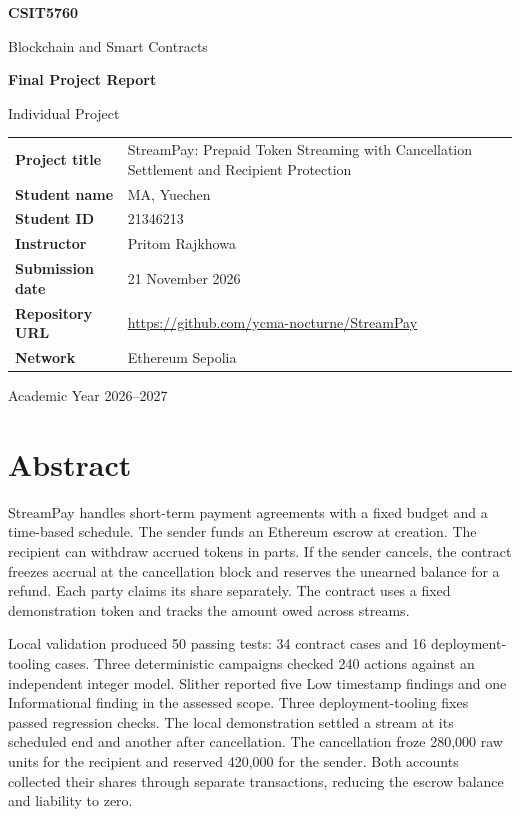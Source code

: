 \documentclass[12pt,a4paper]{report}
\begin{document}
\raggedbottom
\hypersetup{pageanchor=false}
\begin{titlepage}
\centering
\vspace*{1.4cm}
{\LARGE\bfseries CSIT5760\par}
\vspace{0.3cm}
{\Large Blockchain and Smart Contracts\par}
\vspace{1.2cm}
{\Huge\bfseries Final Project Report\par}
\vspace{0.3cm}
{\Large Individual Project\par}
\vfill
\begin{tabularx}{\linewidth}{@{}P{3.4cm}Y@{}}
\toprule
\textbf{Project title} & StreamPay: Prepaid Token Streaming with Cancellation Settlement and Recipient Protection\\
\textbf{Student name} & MA, Yuechen\\
\textbf{Student ID} & 21346213\\
\textbf{Instructor} & Pritom Rajkhowa\\
\textbf{Submission date} & 21 November 2026\\
\textbf{Repository URL} & \url{https://github.com/ycma-nocturne/StreamPay}\\
\textbf{Network} & Ethereum Sepolia\\
\bottomrule
\end{tabularx}
\vfill
{\large Academic Year 2026--2027\par}
\end{titlepage}
\hypersetup{pageanchor=true}

\chapter*{Abstract}
StreamPay handles short-term payment agreements with a fixed budget and a time-based schedule. The sender funds an Ethereum escrow at creation. The recipient can withdraw accrued tokens in parts. If the sender cancels, the contract freezes accrual at the cancellation block and reserves the unearned balance for a refund. Each party claims its share separately. The contract uses a fixed demonstration token and tracks the amount owed across streams.

Local validation produced 50 passing tests: 34 contract cases and 16 deployment-tooling cases. Three deterministic campaigns checked 240 actions against an independent integer model. Slither reported five Low timestamp findings and one Informational finding in the assessed scope. Three deployment-tooling fixes passed regression checks. The local demonstration settled a stream at its scheduled end and another after cancellation. The cancellation froze 280,000 raw units for the recipient and reserved 420,000 for the sender. Both accounts collected their shares through separate transactions, reducing the escrow balance and liability to zero.
\end{document}
